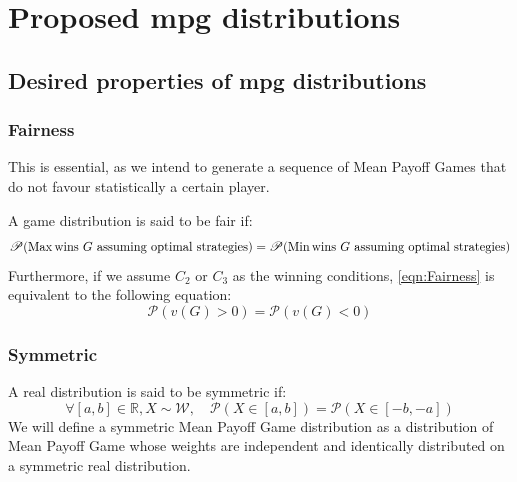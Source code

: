 \newpage
\section{Proposed \acrshort{mpg} distributions}
\subsection{Desired properties of \acrshort{mpg} distributions}
\label{section:Dataset:ProposedDistributions:Properties}
\subsubsection{Fairness}
This is essential, as we intend to generate a sequence of Mean Payoff Games that do not favour statistically a certain player.

A game distribution is said to be fair if:
\begin{equation}
	\label{eqn:Fairness}
	\mathscr{P}(\operatorname{Max} \text{wins}\ G \ \text{assuming optimal strategies} ) = 	\mathscr{P}(\operatorname{Min} \text{wins}\ G \ \text{assuming optimal strategies} )
\end{equation}
Furthermore, if we assume $C_2$ or $C_3$ as the winning conditions, \eqref{eqn:Fairness} is equivalent to the following equation:
\begin{equation*}
	\mathscr{P}(v(G) > 0) = \mathscr{P}(v(G) < 0)
\end{equation*}
\subsubsection{Symmetric}
A real distribution is said to be symmetric if:
$$
\forall [a,b]\in \mathbb{R},X\sim \mathcal{W},\quad \mathscr{P}(X\in [a,b]) = \mathscr{P}(X\in [-b,-a])
$$
We will define a symmetric Mean Payoff Game distribution as a distribution of Mean Payoff Game whose weights are independent and identically distributed on a symmetric real distribution.


